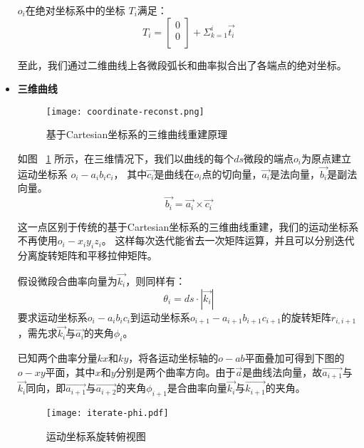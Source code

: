 \begin{itemize}
$o_i$在绝对坐标系中的坐标 $T_i$满足：
    \begin{equation}
    T_i = \left[
    		\begin{matrix}
        0\\
        0\\
      	\end{matrix}
      \right]
      + \Sigma_{k=1} ^ {i} \vec{t_i}
    \end{equation}
    
至此，我们通过二维曲线上各微段弧长和曲率拟合出了各端点的绝对坐标。

\item \textbf{三维曲线} \\

\FloatBarrier
\begin{figure}
\centering
\texttt{[image: coordinate-reconst.png]}
\caption{基于Cartesian坐标系的三维曲线重建原理}
\label{fig:coordinate-reconst} 
\end{figure}
\FloatBarrier

如图 ~\ref{fig:coordinate-reconst} 所示，在三维情况下，我们以曲线的每个$ds$微段的端点$o_i$为原点建立运动坐标系\cite{three-dimensional-curve} $o_i-a_ib_ic_i$，
其中$\vec{c_i}$是曲线在$o_i$点的切向量，$\vec{a_i}$是法向量，$\vec{b_i}$是副法向量。
\begin{equation}
\vec{b_i} = \vec{a_i} \times \vec{c_i}
\end{equation}

这一点区别于传统的基于Cartesian坐标系的三维曲线重建，我们的运动坐标系不再使用$o_i-x_iy_iz_i$。
这样每次迭代能省去一次矩阵运算，并且可以分别迭代分离旋转矩阵和平移拉伸矩阵。

假设微段合曲率向量为$\vec{k_i}$，则同样有：
\begin{equation}
\theta_i = ds\cdot |\vec{k_i}|
\end{equation}
要求运动坐标系$o_i-a_ib_ic_i$到运动坐标系$o_{i+1}-a_{i+1}b_{i+1}c_{i+1}$的旋转矩阵$r_{i, i+1}$，需先求$\vec{k_i}$与$\vec{a_i}$的夹角$\phi_i$。

已知两个曲率分量$kx$和$ky$，将各运动坐标轴的$o-ab$平面叠加可得到下图的$o-xy$平面，其中$x$和$y$分别是两个曲率方向。由于$\vec{a}$是曲线法向量，故$\vec{a_{i+1}}$与$\vec{k_i}$同向，即$\vec{a_{i+1}}$与$\vec{a_{i+2}}$的夹角$\phi_{i+1}$是合曲率向量$\vec{k_i}$与$\vec{k_{i+1}}$的夹角。

\FloatBarrier
\begin{figure}
\centering
\texttt{[image: iterate-phi.pdf]}
\caption{运动坐标系旋转俯视图}
\label{fig:iterate-phi} 
\end{figure}
\FloatBarrier


\end{itemize}
